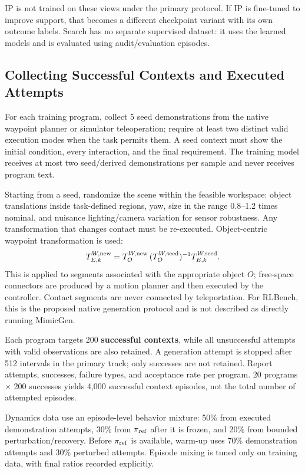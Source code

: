 \documentclass[
  10pt,
]{article}
\begin{document}
IP is not trained on these views under the primary protocol. If IP is fine-tuned to improve support, that becomes a different checkpoint variant with its own outcome labels. Search has no separate supervised dataset: it uses the learned models and is evaluated using audit/evaluation episodes.

\hypertarget{thu-successful-contexts-vuxe0-executed-attempts}{%
\subsection{Collecting Successful Contexts and Executed Attempts}\label{thu-successful-contexts-vuxe0-executed-attempts}}

For each training program, collect 5 seed demonstrations from the native waypoint planner or simulator teleoperation; require at least two distinct valid execution modes when the task permits them. A seed context must show the initial condition, every interaction, and the final requirement. The training model receives at most two seed/derived demonstrations per sample and never receives program text.

Starting from a seed, randomize the scene within the feasible workspace: object translations inside task-defined regions, yaw, size in the range 0.8--1.2 times nominal, and nuisance lighting/camera variation for sensor robustness. Any transformation that changes contact must be re-executed. Object-centric waypoint transformation is used:
\begin{equation}\label{eq:adaptation}
T^{W,{\rm new}}_{E,k}
=T^{W,{\rm new}}_{O}\,(T^{W,{\rm seed}}_{O})^{-1}T^{W,{\rm seed}}_{E,k}.
\end{equation}
This is applied to segments associated with the appropriate object \(O\); free-space connectors are produced by a motion planner and then executed by the controller. Contact segments are never connected by teleportation. For RLBench, this is the proposed native generation protocol and is not described as directly running MimicGen.

Each program targets 200 \textbf{successful contexts}, while all unsuccessful attempts with valid observations are also retained. A generation attempt is stopped after 512 intervals in the primary track; only successes are not retained. Report attempts, successes, failure types, and acceptance rate per program. 20 programs \(\times\) 200 successes yields 4,000 successful context episodes, not the total number of attempted episodes.

Dynamics data use an episode-level behavior mixture: 50\% from executed demonstration attempts, 30\% from \(\pi_{\rm ref}\) after it is frozen, and 20\% from bounded perturbation/recovery. Before \(\pi_{\rm ref}\) is available, warm-up uses 70\% demonstration attempts and 30\% perturbed attempts. Episode mixing is tuned only on training data, with final ratios recorded explicitly.
\end{document}
